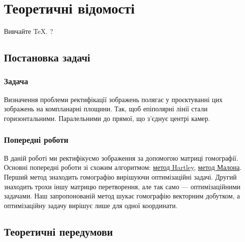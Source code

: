 \chapter{Теоретичні відомості}

Вивчайте \TeX \cite{Knuth:1984}.
?

\section{Постановка задачі}
\subsection{Задача}
Визначення проблеми ректифікації зображень полягає у проєктуванні  цих зображень 
на компланарні площини. Так, щоб епіполярні лінії стали горизонтальними.
Паралельними до прямої, що з'єднує центрі камер.
\subsection{Попередні роботи}
В даній роботі ми ректифікуємо зображення за допомогою матриці гомографії. 
Основні попередні роботи зі схожим алгоритмом: 
\href{https://users.cecs.anu.edu.au/~hartley/Papers/joint-epipolar/journal/joint3.pdf}
{метод Hartley}, 
\href{https://citeseerx.ist.psu.edu/viewdoc/download?doi=10.1.1.97.7214&rep=rep1&type=pdf}
{метод Малона}. Перший метод знаходить гомографію вирішуючи оптимізаційні 
задачі. Другий знаходить трохи іншу матрицю перетворення, але так само --- 
оптимізаційними задачами. Наш запропонованій метод шукає гомографію векторним 
добутком, а оптимізаційну задачу вирішує лише для одної координати.


\section{Теоретичні передумови}
